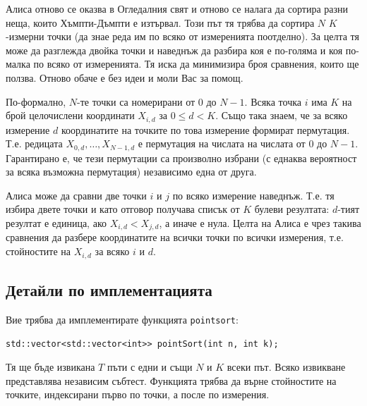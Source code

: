 \documentclass[12pt]{article}
\begin{document}
\renewcommand{\tl}{$7.5$ сек.}
\renewcommand{\ml}{$256$ MB}


\renewcommand{\header}{
    XLI НАЦИОНАЛНА ОЛИМмИАДА ПО ИНФОРМАТИКА\\
    Национален кръг\\
    Велико Търново, 7 - 10 март 2025 г.\\
    Група AB, 9-12 клас, Ден 1
}

\vspace{0.1in}

Алиса отново се оказва в Огледалния свят и отново се налага да сортира разни неща, които Хъмпти-Дъмпти е изтървал. Този път тя трябва да сортира $N$ $K$-измерни точки (да знае реда им по всяко от измеренията поотделно). За целта тя може да разглежда двойка точки и наведнъж да разбира коя е по-голяма и коя по-малка по всяко от измеренията. Тя иска да минимизира броя сравнения, които ще ползва. Отново обаче е без идеи и моли Вас за помощ.

По-формално, $N$-те точки са номерирани от $0$ до $N-1$. Всяка точка $i$ има $K$ на брой целочислени координати $X_{i,d}$ за $0 \leq d < K$. Също така знаем, че за всяко измерение $d$ координатите на точките по това измерение формират пермутация. Т.е. редицата $X_{0,d}, \dots, X_{N-1,d}$ е пермутация на числата на числата от $0$ до $N-1$. Гарантирано е, че тези пермутации са произволно избрани (с еднаква вероятност за всяка възможна пермутация) независимо една от друга.

Алиса може да сравни две точки $i$ и $j$ по всяко измерение наведнъж. Т.е. тя избира двете точки и като отговор получава списък от $K$ булеви резултата: $d$-тият резултат е единица, ако $X_{i,d} < X_{j,d}$, а иначе е нула. Целта на Алиса е чрез такива сравнения да разбере координатите на всички точки по всички измерения, т.е. стойностите на $X_{i,d}$ за всяко $i$ и $d$.

\subsection{Детайли по имплементацията}

Вие трябва да имплементирате функцията \verb|pointsort|:

\verb|std::vector<std::vector<int>> pointSort(int n, int k);|

Тя ще бъде извикана $T$ пъти с едни и същи $N$ и $K$ всеки път. Всяко извикване представлява независим събтест. Функцията трябва да върне стойностите на точките, индексирани първо по точки, а после по измерения.
\end{document}
